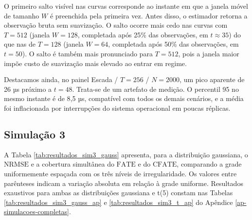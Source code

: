 O primeiro salto visível nas curvas corresponde ao instante em que a janela móvel de tamanho \(W\) é preenchida pela primeira vez.
Antes disso, o estimador retorna a observação bruta sem suavização.
O salto ocorre mais cedo nas curvas com \(T = 512\) (janela \(W = 128\), completada após 25\% das observações, em \(t \approx 35\)) do que nas de \(T = 128\) (janela \(W = 64\), completada após 50\% das observações, em \(t = 50\)).
O salto é também mais pronunciado para \(T = 512\), pois a janela maior impõe custo de suavização mais elevado ao entrar em regime.

Destacamos ainda, no painel Escada / \(T = 256\) / \(N = 2000\), um pico aparente de 26 µs próximo a \(t = 48\).
Trata-se de um artefato de medição.
O percentil 95 no mesmo instante é de 8{,}5 µs, compatível com todos os demais cenários, e a média foi inflacionada por interrupções do sistema operacional em poucas réplicas.

\FloatBarrier
\subsection{Simulação 3}

A Tabela \ref{tab:resultados_sim3_gauss} apresenta, para a distribuição gaussiana, o \(\mathrm{NRMSE}\) e a cobertura simultânea do \(\mathrm{FATE}\) e do \(\mathrm{CFATE}\), comparando a grade uniformemente espaçada com os três níveis de irregularidade. 
Os valores entre parênteses indicam a variação absoluta em relação à grade uniforme. 
Resultados exaustivos para ambas as distribuições gaussiana e t(5) constam nas Tabelas \ref{tab:resultados_sim3_gauss_ap} e \ref{tab:resultados_sim3_t_ap} do Apêndice \ref{ap-simulacoes-completas}.

